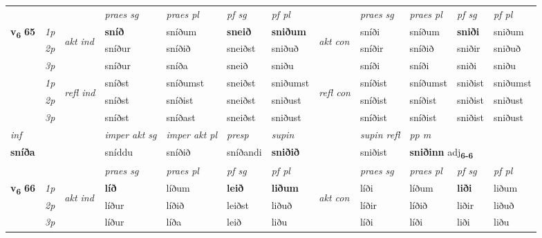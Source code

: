 \begin{longtable}[l]{X>{\footnotesize\itshape}llXXXXlXXXX}
 & &   & \textit{praes sg}  & \textit{praes pl}    & \textit{ pf sg} & \textit{pf pl} & & \textit{praes sg}  & \textit{praes pl}    & \textit{pf sg} & \textit{pf pl }  \\ \cmidrule{4-7} \cmidrule{9-12}
 \multirow{2}{*}{{{\textbf{v{\textsubscript{6}}} \Large{\textbf{65}}}}}  & 1p & \multirow{3}{*}{\begin{turn}{90}\textit{akt ind}\end{turn}} & \textbf{sníð} & sníðum & \textbf{sneið} & \textbf{sniðum} & \multirow{3}{*}{\begin{turn}{90}\textit{akt con}\end{turn}} &sníði & sníðum & \textbf{sniði} & sniðum\\*
 & 2p &  &  sníður  & sníðið & sneiðst & sniðuð & & sníðir & sníðið & sniðir & sniðuð \\*
 & 3p &  & sníður & sníða & sneið & sniðu & & sníði & sníði& sniði & sniðu \\*
\cmidrule{4-7} \cmidrule{9-12}
 & 1p & \multirow{3}{*}{\begin{turn}{90}\textit{refl ind}\end{turn}}  & sníðst & sníðumst & sneiðst & sniðumst & \multirow{3}{*}{\begin{turn}{90}\textit{refl con}\end{turn}}  &sníðist & sníðumst & sniðist & sniðumst \\*
 & 2p &  & sníðst & sníðist & sneiðst & sniðust & &sníðist & sníðist & sniðist & sniðust \\*
 & 3p  & & sníðst & sníðast & sneiðst & sniðust & & sníðist & sníðist& sniðist & sniðust \\*
\cmidrule{4-7} \cmidrule{9-12}

   {\textit{inf}} & &  & \textit{imper akt sg} & \textit{imper akt pl}   & \textit{presp} & \textit{supin} && \textit{supin refl} & \textit{pp m} \\*
  {\textbf{sníða}} & && sníddu  & sníðið   & sníðandi &  \textbf{sniðið} && sniðist & \multicolumn{2}{l}{\textbf{sniðinn} adj\textbf{\textsubscript{6-6}}} \\*

\midrule

 & &   & \textit{praes sg}  & \textit{praes pl}    & \textit{ pf sg} & \textit{pf pl} & & \textit{praes sg}  & \textit{praes pl}    & \textit{pf sg} & \textit{pf pl }  \\ \cmidrule{4-7} \cmidrule{9-12}
 \multirow{2}{*}{{{\textbf{v{\textsubscript{6}}} \Large{\textbf{66}}}}}  & 1p & \multirow{3}{*}{\begin{turn}{90}\textit{akt ind}\end{turn}} & \textbf{líð} & líðum & \textbf{leið} & \textbf{liðum} & \multirow{3}{*}{\begin{turn}{90}\textit{akt con}\end{turn}} &líði & líðum & \textbf{liði} & liðum\\*
 & 2p &  &  líður  & líðið & leiðst & liðuð & & líðir & líðið & liðir & liðuð \\*
 & 3p &  & líður & líða & leið & liðu & & líði & líði& liði & liðu \\*
\cmidrule{4-7} \cmidrule{9-12}


\end{longtable}
